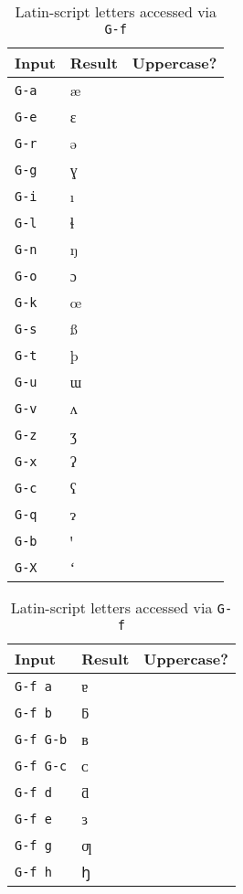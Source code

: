 \documentclass[oneside]{memoir}
\newcommand{\cmark}{\ding{51}}
\newcommand{\xmark}{\ding{55}}
\newcommand{\key}{\verb}
\begin{document}
{{{\begin{table}
\centering
\begin{minipage}{0.3\linewidth}
\centering
\caption{Latin-script letters accessed via a single key}
\label{tab:single_key}
\begin{tabular}{lll}
\toprule
Input & Result & Uppercase? \\
\midrule
\key|G-a| & æ & \cmark \\
\key|G-e| & ɛ & \cmark \\
\key|G-r| & ə & \cmark \\
\key|G-g| & ɣ & \cmark \\
\key|G-i| & ı & \xmark \\
\key|G-l| & ɬ & \cmark \\
\key|G-n| & ŋ & \cmark \\
\key|G-o| & ɔ & \cmark \\
\key|G-k| & œ & \cmark \\
\key|G-s| & ß & \cmark \\
\key|G-t| & þ & \cmark \\
\key|G-u| & ɯ & \cmark \\
\key|G-v| & ʌ & \cmark \\
\key|G-z| & ʒ & \cmark \\
\key|G-x| & ʔ & \xmark \\
\key|G-c| & ʕ & \xmark \\
\key|G-q| & ɂ & \cmark \\
\key|G-b| & ꞌ & \cmark \\
\key|G-X| & ʻ & \xmark \\
\bottomrule
\end{tabular}
\end{minipage}\hfill
\begin{minipage}{0.3\linewidth}
\centering
\cprotect\caption{Latin-script letters accessed via \key|G-f|}
\label{tab:letters_g-f}
\begin{tabular}{lll}
\toprule
Input & Result & Uppercase? \\
\midrule
\key|G-f a| & ɐ & \cmark \\
\key|G-f b| & ƃ & \cmark \\
\key|G-f G-b| & ʙ & \xmark \\
\key|G-f G-c| & ᴄ & \xmark \\
\key|G-f d| & ƌ & \cmark \\
\key|G-f e| & ɜ & \cmark \\
\key|G-f g| & ƣ & \cmark \\
\key|G-f h| & ꜧ & \cmark \\

\end{tabular}
\end{minipage}
\end{table}}}}
\end{document}
